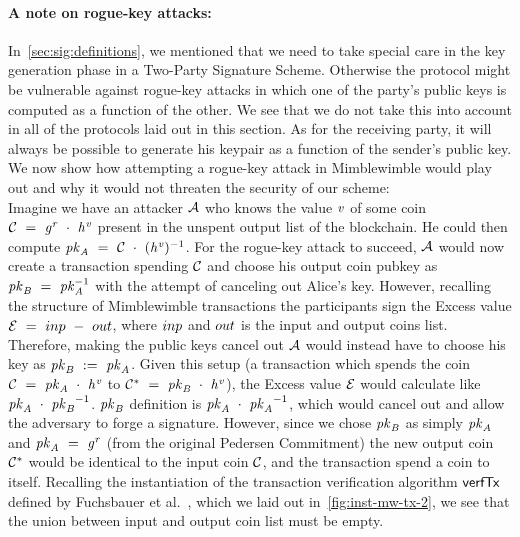 \paragraph{A note on rogue-key attacks:} In~\cref{sec:sig:definitions}, we mentioned that we need to take special care in the key generation phase in a Two-Party Signature Scheme.
Otherwise the protocol might be vulnerable against rogue-key attacks in which one of the party's public keys is computed as a function of the other.
We see that we do not take this into account in all of the protocols laid out in this section.
As for the receiving party, it will always be possible to generate his keypair as a function of the sender's public key.
We now show how attempting a rogue-key attack in Mimblewimble would play out and why it would not threaten the security of our scheme:\\
Imagine we have an attacker $\mathcal{A}$ who knows the value $\mathit{v}$ of some coin $\mathcal{C} ~=~ \mathit{g}^{\mathit{r}} ~\cdot~ \mathit{h}^{\mathit{v}}$ present in the unspent output list of the blockchain.
He could then compute $\mathit{pk}_{\mathit{A}} ~=~ \mathcal{C} ~\cdot~ {(\mathit{h}^{\mathit{v}}})^{-1}$.
For the rogue-key attack to succeed, $\mathcal{A}$ would now create a transaction spending $\mathcal{C}$ and choose his output coin pubkey as $\mathit{pk}_{\mathit{B}} ~=~ \mathit{pk}_{\mathit{A}}^{-1}$ with the attempt of canceling out Alice's key.
However, recalling the structure of Mimblewimble transactions the participants sign the Excess value $\mathcal{E} ~=~ inp ~-~ out$, where $inp$ and $out$ is the input and output coins list.
Therefore, making the public keys cancel out $\mathcal{A}$ would instead have to choose his key as $\mathit{pk}_{\mathit{B}} ~:=~ \mathit{pk}_{\mathit{A}}$.
Given this setup (a transaction which spends the coin $\mathcal{C} ~=~ \mathit{pk}_{\mathit{A}} ~\cdot~ \mathit{h}^{\mathit{v}}$ to $\mathcal{C}^* ~=~ \mathit{pk}_{\mathit{B}} ~\cdot~\mathit{h}^{\mathit{v}}$), the Excess value $\mathcal{E}$ would calculate like $\mathit{pk}_{\mathit{A}} ~\cdot~ {\mathit{pk}_{\mathit{B}}}^{-1}$.
$\mathit{pk}_{\mathit{B}}$ definition is $\mathit{pk}_{\mathit{A}} ~\cdot~ {\mathit{pk}_{\mathit{A}}}^{-1}$, which would cancel out and allow the adversary to forge a signature.
However, since we chose $\mathit{pk}_{\mathit{B}}$ as simply $\mathit{pk}_{\mathit{A}}$ and $\mathit{pk}_{\mathit{A}} ~=~ \mathit{g}^{\mathit{r}}$ (from the original Pedersen Commitment) the new output coin $\mathcal{C}^*$ would be identical to the input coin $\mathcal{C}$, and the transaction spend a coin to itself.
Recalling the instantiation of the transaction verification algorithm $\mathsf{verfTx}$ defined by Fuchsbauer et al.~\cite{fuchsbauer2019aggregate}, which we laid out in~\cref{fig:inst-mw-tx-2}, we see that the union between input and output coin list must be empty.
